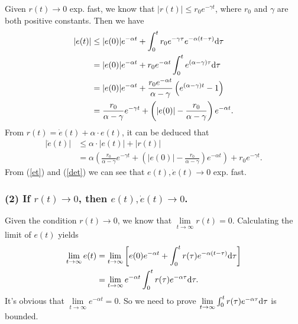 \documentclass[12pt,a4paper]{article}
\begin{document}
\indent Given $r(t)\rightarrow 0$ exp. fast, we know that $|r(t)|\le r_0 e^{-\gamma t}$, where $r_0$ and $\gamma$ are both positive constants. Then we have
\begin{equation}
\begin{aligned}
|e(t)| &\le |e(0)|e^{-\alpha t}+\int_0^t{r_0 e^{-\gamma\tau}e^{-\alpha(t-\tau)}}{\rm d}\tau \\
        &= |e(0)|e^{-\alpha t}+r_0 e^{-\alpha t}\int_0^t{e^{(\alpha-\gamma)\tau}}{\rm d}\tau \\
        &= |e(0)|e^{-\alpha t}+\frac{r_0 e^{-\alpha t}}{\alpha-\gamma} \left(e^{(\alpha-\gamma)t}-1\right) \\
        &= \frac{r_0}{\alpha-\gamma}e^{-\gamma t}+\left(|e(0)|-\frac{r_0}{\alpha-\gamma}\right)e^{-\alpha t}.
\end{aligned}
\label{et}
\end{equation}
From $r(t)=\dot{e}(t)+\alpha\cdot e(t)$, it can be deduced that
\begin{equation}
\begin{aligned}
|\dot{e}(t)|&\le \alpha\cdot |e(t)|+ |r(t)|\\
            &= \alpha\left(\frac{r_0}{\alpha-\gamma}e^{-\gamma t}+\left(|e(0)|-\frac{r_0}{\alpha-\gamma}\right)e^{-\alpha t}\right) +r_0e^{-\gamma t}.
\end{aligned}
\label{det}
\end{equation}
From (\ref{et}) and (\ref{det}) we can see that $e(t), \dot{e}(t)\rightarrow 0$ exp. fast.

\subsubsection*{(2) If $r(t)\rightarrow 0$, then $e(t), \dot{e}(t)\rightarrow 0$.}

\indent Given the condition $r(t)\rightarrow 0$, we know that $\lim\limits_{t\to\infty}r(t)=0$. Calculating the limit of $e(t)$ yields
\begin{equation}
\begin{aligned}
\lim\limits_{t\to\infty}e(t)
    &= \lim\limits_{t\to\infty} \left[e(0)e^{-\alpha t}+\int_0^t r(\tau)e^{-\alpha(t-\tau)}{\rm d}\tau\right] \\
    &= \lim\limits_{t\to\infty} e^{-\alpha t} \int_0^t r(\tau)e^{-\alpha\tau}{\rm d}\tau.
\end{aligned}
\end{equation}
It's obvious that $\lim\limits_{t\to\infty} e^{-\alpha t}=0$. So we need to prove $\lim\limits_{t\to\infty} \int_0^t r(\tau)e^{-\alpha\tau}{\rm d}\tau$ is bounded.
\end{document}

